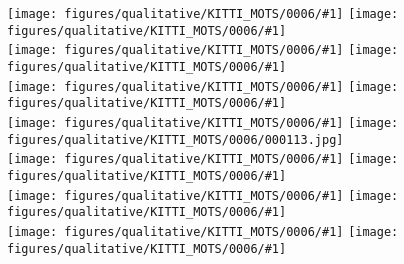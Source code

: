 \documentclass[10pt,twocolumn,letterpaper]{article}
\begin{document}
\newcommand{\imgkittia}[1] {\texttt{[image: figures/qualitative/KITTI\_MOTS/0006/\#1]}}  
\begin{figure*}[t!]
	\centering
\imgkittia{000106.jpg}
		\vspace{1.2pt}
		\imgkittia{000107.jpg}
		\\

		\imgkittia{000108.jpg}		
		\vspace{1.2pt}
		\imgkittia{000109.jpg}
		\\
		
		\imgkittia{000110.jpg}
 		\vspace{1.2pt}
		\imgkittia{000111.jpg}
		\\
		
		\imgkittia{000112.jpg}
		\vspace{1.2pt}
\texttt{[image: figures/qualitative/KITTI\_MOTS/0006/000113.jpg]}
		\\

		\imgkittia{000114.jpg}		
		\vspace{1.2pt}
		\imgkittia{000115.jpg}
		\\

		\imgkittia{000116.jpg}
		\vspace{1.2pt}
		\imgkittia{000117.jpg}
		\\
		
		\imgkittia{000118.jpg}
		\vspace{1.2pt}
		\imgkittia{000119.jpg}
\vspace{-6pt}\caption{\textbf{Qualitative Results on KITTI MOTS.} In simpler scenes, the model is able to continue a track with the same ID after a missing detection (highlighted by red ellipses).
	}
	\label{fig:kitti-results1}
\end{figure*}
\end{document}
